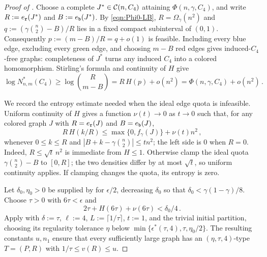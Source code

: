 \begin{proof}[Proof of ]
Choose a complete $J^\ast\in{\mathcal C}(n,C_4)$ attaining $\Phi(n,\gamma,C_4)$, and write $R:=e_{\normalfont\texttt r}(J^\ast)$ and $B:=e_{\normalfont\texttt b}(J^\ast)$. By \eqref{eqn:Phi0-LB}, $R=\Omega_\gamma(n^2)$ and $q:=(\gamma\binom{n}{2}-B)/R$ lies in a fixed compact subinterval of $(0,1)$. Consequently $p:=(m-B)/R=q+o(1)$ is feasible. Including every blue edge, excluding every green edge, and choosing $m-B$ red edges gives induced-$C_4$-free graphs: completeness of $J^\ast$ turns any induced $C_4$ into a colored homomorphism. Stirling's formula and continuity of $H$ give
\begin{equation}\label{eqn:lower-bound-Nstar}
\log N^\ast_{n,m}(C_4)\geq\log\binom{R}{m-B}=R\,H(p)+o(n^2)=\Phi(n,\gamma,C_4)+o(n^2)\,.
\end{equation}

We record the entropy estimate needed when the ideal edge quota is infeasible. Uniform continuity of $H$ gives a function $\nu(t)\to0$ as $t\to0$ such that, for any colored graph $J$ with $R=e_{\normalfont\texttt r}(J)$ and $B=e_{\normalfont\texttt b}(J)$,
$$R\,H(k/R)\leq\max\{0,f_\gamma(J)\}+\nu(t)n^2\,,$$
whenever $0\leq k\leq R$ and $|B+k-\gamma\binom{n}{2}|\leq tn^2$; the left side is $0$ when $R=0$. Indeed, $R\leq\sqrt{t}\,n^2$ is immediate from $H\leq1$. Otherwise clamp the ideal quota $\gamma\binom{n}{2}-B$ to $[0,R]$; the two densities differ by at most $\sqrt{t}$, so uniform continuity applies. If clamping changes the quota, its entropy is zero.

Let $\delta_0,\eta_0>0$ be supplied by  for $\epsilon/2$, decreasing $\delta_0$ so that $\delta_0<\gamma(1-\gamma)/8$. Choose $\tau>0$ with $6\tau<\epsilon$ and
$$2\tau+H(6\tau)+\nu(6\tau)<\delta_0/4\,.$$
Apply  with $\delta:=\tau$, $\ell:=4$, $L:=\lceil1/\tau\rceil$, $t:=1$, and the trivial initial partition, choosing its regularity tolerance $\eta$ below $\min\{\epsilon^\ast(\tau,4),\tau,\eta_0/2\}$. The resulting constants $u,n_1$ ensure that every sufficiently large graph has an $(\eta,\tau,4)$-type $T=(P,R)$ with $1/\tau\leq v(R)\leq u$.


\end{proof}
